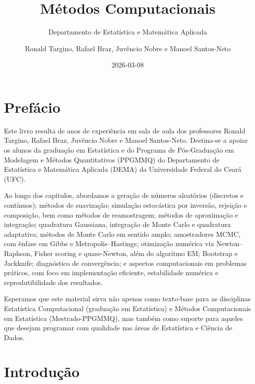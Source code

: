 \documentclass[
  letterpaper,
  DIV=11,
  numbers=noendperiod]{scrreprt}
\title{Métodos Computacionais}
\subtitle{Departamento de Estatística e Matemática Aplicada}
\author{Ronald Targino, Rafael Braz, Juvêncio Nobre e Manoel
Santos-Neto}
\date{2026-03-08}
\renewcommand*\contentsname{Índice}
\newcommand\contentsname{Índice}
\begin{document}
\maketitle

\renewcommand*\contentsname{Índice}
{
\hypersetup{linkcolor=}
\setcounter{tocdepth}{2}
\tableofcontents
}

\chapter*{Prefácio}\label{prefuxe1cio}


Este livro resulta de anos de experiência em sala de aula dos
professores Ronald Targino, Rafael Braz, Juvêncio Nobre e Manoel
Santos-Neto. Destina-se a apoiar os alunos da graduação em Estatística e
do Programa de Pós-Graduação em Modelagem e Métodos Quantitativos
(PPGMMQ) do Departamento de Estatística e Matemática Aplicada (DEMA) da
Universidade Federal do Ceará (UFC).

Ao longo dos capítulos, abordamos a geração de números aleatórios
(discretos e contínuos); métodos de suavização; simulação estocástica
por inversão, rejeição e composição, bem como métodos de reamostragem;
métodos de aproximação e integração; quadratura Gaussiana, integração de
Monte Carlo e quadratura adaptativa; métodos de Monte Carlo em sentido
amplo; amostradores MCMC, com ênfase em Gibbs e Metropolis--Hastings;
otimização numérica via Newton--Raphson, Fisher scoring e quase-Newton,
além do algoritmo EM; Bootstrap e Jackknife; diagnóstico de
convergência; e aspectos computacionais em problemas práticos, com foco
em implementação eficiente, estabilidade numérica e reprodutibilidade
dos resultados.

Esperamos que este material sirva não apenas como texto-base para as
disciplinas Estatística Computacional (graduação em Estatística) e
Métodos Computacionais em Estatística (Mestrado-PPGMMQ), mas também como
suporte para aqueles que desejam programar com qualidade nas áreas de
Estatística e Ciência de Dados.


\chapter{Introdução}\label{introduuxe7uxe3o}

\end{document}
